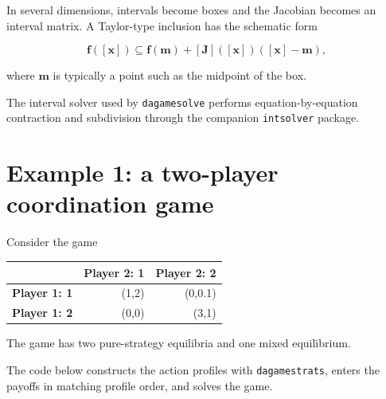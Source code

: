 \documentclass[11pt]{article}
\begin{document}
In several dimensions, intervals become boxes and the Jacobian becomes
an interval matrix. A Taylor-type inclusion has the schematic form

\[
\mathbf{f}([\mathbf{x}])
\subseteq
\mathbf{f}(\mathbf{m})
+
[\mathbf{J}]([\mathbf {x}])([\mathbf{x}]-\mathbf{m}),
\]

where \(\mathbf{m}\) is typically a point such as the midpoint of the
box.

The interval solver used by \texttt{dagamesolve} performs
equation-by-equation contraction and subdivision through the companion
\texttt{intsolver} package.

    \section{Example 1: a two-player coordination
game}\label{example-1-a-two-player-coordination-game}

Consider the game

{\def\LTcaptype{none} %
\begin{longtable}[]{@{}lrr@{}}
\toprule\noalign{}
& Player 2: 1 & Player 2: 2 \\
\midrule\noalign{}
\endhead
\bottomrule\noalign{}
\endlastfoot
\textbf{Player 1: 1} & (1,2) & (0,0.1) \\
\textbf{Player 1: 2} & (0,0) & (3,1) \\
\end{longtable}
}

The game has two pure-strategy equilibria and one mixed equilibrium.

The code below constructs the action profiles with
\texttt{dagamestrats}, enters the payoffs in matching profile order, and
solves the game.
\end{document}
